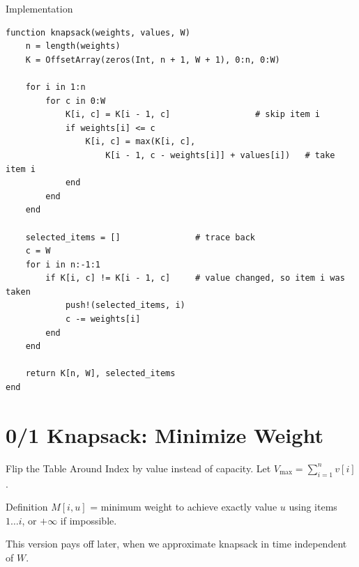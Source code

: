 \documentclass[10pt,aspectratio=169]{beamer}
\begin{document}
\begin{frame}[fragile]{Implementation}
  \begin{lstlisting}[basicstyle=\ttfamily\scriptsize]
function knapsack(weights, values, W)
    n = length(weights)
    K = OffsetArray(zeros(Int, n + 1, W + 1), 0:n, 0:W)

    for i in 1:n
        for c in 0:W
            K[i, c] = K[i - 1, c]                 # skip item i
            if weights[i] <= c
                K[i, c] = max(K[i, c],
                    K[i - 1, c - weights[i]] + values[i])   # take item i
            end
        end
    end

    selected_items = []               # trace back
    c = W
    for i in n:-1:1
        if K[i, c] != K[i - 1, c]     # value changed, so item i was taken
            push!(selected_items, i)
            c -= weights[i]
        end
    end

    return K[n, W], selected_items
end
  \end{lstlisting}
\end{frame}

\section{0/1 Knapsack: Minimize Weight}

\begin{frame}{Flip the Table Around}
  Index by \alert{value} instead of capacity. Let
  $V_{\max} = \sum_{i=1}^{n} v[i]$.

  \bigskip
  \begin{block}{Definition}
    $M[i,u]$ = minimum weight to achieve \alert{exactly} value $u$
    using items $1 \ldots i$, or $+\infty$ if impossible.
  \end{block}

  \bigskip
  \begin{center}
    \small This version pays off later, when we approximate knapsack in time
    independent of $W$.
  \end{center}
\end{frame}
\end{document}
